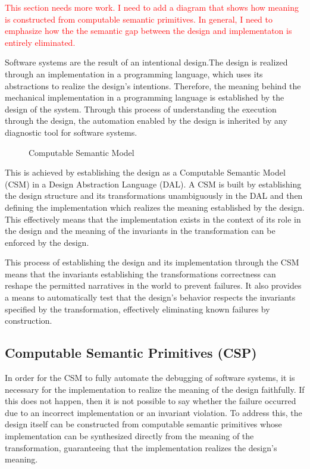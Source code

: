 \textcolor{red}{This section needs more work. I need to add a diagram that shows how meaning is constructed from computable semantic primitives. In general, I need to emphasize how the the semantic gap between the design and implementaton is entirely eliminated.}

Software systems are the result of an intentional design.The design is realized through an implementation in a programming language, which uses its abstractions to realize the design’s intentions. Therefore, the meaning behind the mechanical implementation in a programming language is established by the design of the system. Through this process of understanding the execution through the design, the automation enabled by the design is inherited by any diagnostic tool for software systems.

\begin{figure}[htbp]
    
    \caption{Computable Semantic Model}
    \label{fig:computable_semantic_model}
\end{figure}

This is achieved by establishing the design as a Computable Semantic Model (CSM) in a Design Abstraction Language (DAL). A CSM is built by establishing the design structure and its transformations unambiguously in the DAL and then defining the implementation which realizes the meaning established by the design. This effectively means that the implementation exists in the context of its role in the design and the meaning of the invariants in the transformation can be enforced by the design.

This process of establishing the design and its implementation through the CSM means that the invariants establishing the transformations correctness can reshape the permitted narratives in the world to prevent failures. It also provides a means to automatically test that the design's behavior respects the invariants specified by the transformation, effectively eliminating known failures by construction.

\subsection{Computable Semantic Primitives (CSP)}

In order for the CSM to fully automate the debugging of software systems, it is necessary for the implementation to realize the meaning of the design faithfully. If this does not happen, then it is not possible to say whether the failure occurred due to an incorrect implementation or an invariant violation. To address this, the design itself can be constructed from computable semantic primitives whose implementation can be synthesized directly from the meaning of the transformation, guaranteeing that the implementation realizes the design's meaning.

